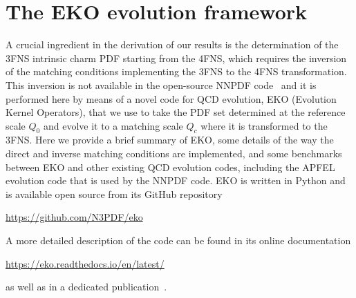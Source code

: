 
\tableofcontents

\clearpage

\clearpage
\section{The EKO evolution framework}
\label{app:ic/eko}

A crucial ingredient in the derivation of our results
is the determination of the 3FNS intrinsic
charm PDF starting from the 4FNS, which requires the inversion of the matching
conditions implementing the 3FNS to 
the 4FNS transformation.
%
This inversion is not available in the open-source NNPDF
code~ and it is performed here by means of a novel code
for QCD evolution, 
 {\sc\small EKO} (Evolution Kernel Operators), that we use to take the
 PDF set determined at the reference scale $Q_0$ and evolve it to a
 matching scale $Q_c$ where it is transformed to the 3FNS.
%
Here we provide a brief summary of {\sc\small
EKO}, some details of the way the direct and inverse matching
conditions are implemented, and some benchmarks between {\sc\small
EKO} and other existing QCD evolution codes, including the  {\sc\small
APFEL}~ evolution code that is used by the
NNPDF code.
{\sc\small EKO} is written in {\sc\small Python} and is available
open source from its {\sc\small GitHub} repository
\begin{center}
\url{https://github.com/N3PDF/eko}
\end{center}
A more detailed description of the code can be found
in its online documentation
\begin{center}
\url{https://eko.readthedocs.io/en/latest/}
\end{center}
as well as in a dedicated publication~.

